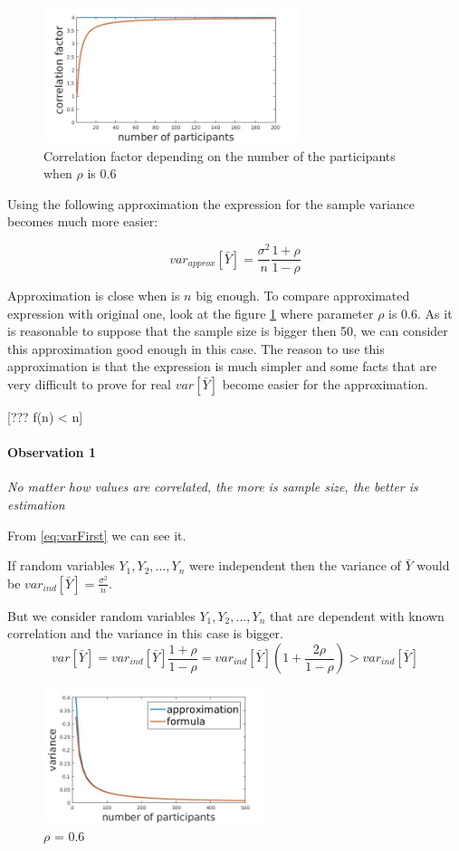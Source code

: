 \documentclass[12pt]{report}
\begin{document}
\begin{figure}[ht]
    \centering
    \includegraphics[height=150px]{corrFactor}
    \caption{ Correlation factor depending on the number of the participants when $\rho$ is 0.6 }
\end{figure}

Using the following approximation the expression for the sample variance becomes much more easier:

$$var_{approx}\left[\bar{Y} \right] = \frac{\sigma^2}{n} \frac{1+\rho}{1-\rho}$$


Approximation is close when is $n$ big enough. To compare approximated expression with original one, look at the figure \ref{fig:lineGame1} where parameter $\rho$ is $0.6$. As it is reasonable to suppose that the sample size is bigger then 50, we can consider this approximation good enough in this case. The reason to use this approximation is that the expression is much simpler and some facts that are very difficult to prove for real $var\left[\bar{Y} \right]$ become easier for the approximation.

[??? f(n) < n]
\paragraph{Observation 1} \textit{No matter how values are correlated, the more is sample size, the better is estimation}

From \ref{eq:varFirst} we can see it.


If random variables $Y_1, Y_2, ..., Y_n$ were independent then the variance of $\bar{Y}$ would be $var_{ind}[\bar{Y}] = \frac{\sigma^2}{n}$.

But we consider random variables $Y_1, Y_2, ..., Y_n$ that are dependent with known correlation and the variance in this case is bigger. 
$$ var\left[\bar{Y} \right] = var_{ind}[\bar{Y}]\frac{1+\rho}{1-\rho} = var_{ind}[\bar{Y}]
\left(1+ \frac{2\rho}{1-\rho} \right) > var_{ind}[\bar{Y}]$$


\begin{figure}[ht]
    \centering
    \includegraphics[height=150px]{lineGame1}
    \caption{ $\rho$ = 0.6 }
    \label{fig:lineGame1}
\end{figure}
\end{document}
